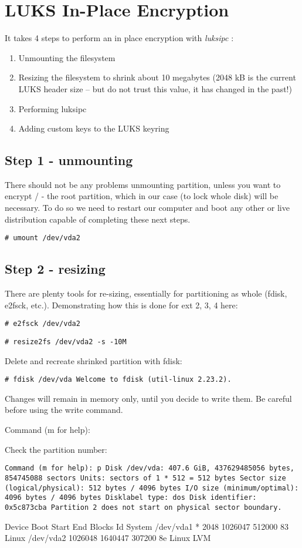 \chapter{LUKS In-Place Encryption}
\label{luksipc}
It takes 4 steps to perform an in place encryption with {\it luksipc} \cite{luksipc}:
\begin{enumerate}
    \item Unmounting the filesystem
    \item Resizing the filesystem to shrink about 10 megabytes (2048 kB is the current LUKS header size -- but do not trust this value, it has changed in the past!)
    \item Performing luksipc
    \item Adding custom keys to the LUKS keyring
\end{enumerate}

\section{Step 1 - unmounting}

There should not be any problems unmounting partition, unless you want to encrypt / - the root partition, which in our case (to lock whole disk) will be necessary.
To do so we need to restart our computer and boot any other or live distribution capable of completing these next steps.

{\tt \# umount /dev/vda2}

\section{Step 2 - resizing}

There are plenty tools for re-sizing, essentially for partitioning as whole (fdisk, e2fsck, etc.).
Demonstrating how this is done for ext 2, 3, 4 here:

{\tt \# e2fsck /dev/vda2}

{\tt \# resize2fs /dev/vda2 -s -10M}

Delete and recreate shrinked partition with fdisk:

{\tt \# fdisk /dev/vda
Welcome to fdisk (util-linux 2.23.2).

Changes will remain in memory only, until you decide to write them. Be careful before using the write command.

Command (m for help):}

Check the partition number:

{\tt Command (m for help): p
Disk /dev/vda: 407.6 GiB, 437629485056 bytes, 854745088 sectors
Units: sectors of 1 * 512 = 512 bytes
Sector size (logical/physical): 512 bytes / 4096 bytes
I/O size (minimum/optimal): 4096 bytes / 4096 bytes
Disklabel type: dos
Disk identifier: 0x5c873cba
Partition 2 does not start on physical sector boundary.

Device        Boot        Start     End         Blocks      Id    System
/dev/vda1      *          2048      1026047     512000      83    Linux
/dev/vda2                 1026048   1640447     307200      8e    Linux LVM}

